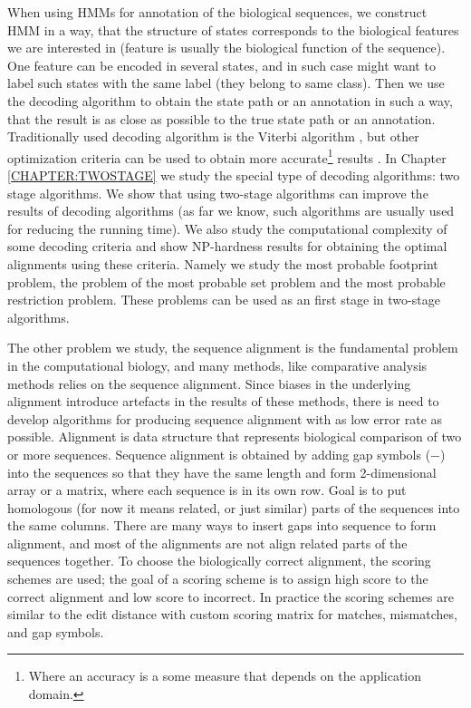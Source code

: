 When using HMMs for annotation of the biological sequences, we construct HMM in
a way, that the structure of states corresponds to the biological features we
are interested in (feature is usually the biological function of the sequence).
One feature can be encoded in several states, and in such case might want to
label such states with the same label (they belong to same class).  Then we use
the decoding algorithm to obtain the state path or an annotation in such a way,
that the result is as close as possible to the true state path or an
annotation. Traditionally used decoding algorithm is the Viterbi algorithm
\cite{Durbin1998}, but other optimization criteria can be used to obtain more
accurate\footnote{Where an accuracy is a some measure that depends on the
application domain.} results \cite{Brown2010, Gross2007, Nanasi2010,
Truszkowski2011}. In Chapter \ref{CHAPTER:TWOSTAGE} we study the special type
of decoding algorithms: two stage algorithms. We show that using two-stage
algorithms can improve the results of decoding algorithms (as far we know, such
algorithms are usually used for reducing the running time). We also study the
computational complexity of some decoding criteria and show NP-hardness results
for obtaining the optimal alignments using these criteria. Namely we study the
most probable footprint problem, the problem of the most probable set problem
and the most probable restriction problem. These problems can be used as an
first stage in two-stage algorithms.

The other problem we study, the sequence alignment is the fundamental problem
in the computational biology, and many methods, like comparative analysis
methods relies on the sequence alignment. Since biases in the underlying
alignment introduce artefacts in the results of these methods, there is need to
develop algorithms for producing sequence alignment with as low error rate as
possible. Alignment is data structure that represents biological comparison of
two or more sequences. Sequence alignment is obtained by adding gap symbols
($-$) into the sequences so that they have the same length and form
2-dimensional array or a matrix, where each sequence is in its own row.  Goal
is to put homologous (for now it means related, or just similar) parts of the
sequences into the same columns. There are many ways to insert gaps into
sequence to form alignment, and most of the alignments are not align related
parts of the sequences together. To choose the biologically correct alignment,
the scoring schemes are used; the goal of a scoring scheme is to assign high
score to the correct alignment and low score to incorrect. In practice the
scoring schemes are similar to the edit distance with custom scoring matrix
for matches, mismatches, and gap symbols. 

